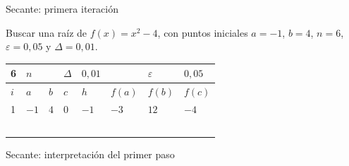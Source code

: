 \documentclass[original_version/main.tex]{subfiles}
\begin{document}
\begin{frame}[t]{Secante: primera iteración}
\begin{minipage}[t][13mm][t]{\textwidth}\small Buscar una raíz de $f(x)=x^2-4$, con puntos iniciales $a=-1$, $b=4$, $n=6$, $\varepsilon=0{,}05$ y $\Delta=0{,}01$.\end{minipage}\par{\scriptsize\setlength{\tabcolsep}{2pt}\renewcommand{\arraystretch}{1}\begin{center}\begin{tabular}{|C{.04\textwidth}|C{.112\textwidth}|C{.112\textwidth}|C{.112\textwidth}|C{.112\textwidth}|C{.112\textwidth}|C{.112\textwidth}|C{.112\textwidth}|}
\hline
\rule{0pt}{4.3mm}6 & $n$ &  &  $\Delta$  & $0{,}01$ &  & $\varepsilon$ & $0{,}05$\\\hline
\rule{0pt}{4.3mm}$i$ & $a$ & $b$ & $c$ & $h$ & $f(a)$ & $f(b)$ & $f(c)$\\\hline
\rule{0pt}{4.3mm}1 & $-1$ & $4$ & $0$ & $-1$ & $-3$ & $12$ & $-4$\\\hline
\rule{0pt}{4.3mm} &  &  &  &  &  &  & \\\hline
\rule{0pt}{4.3mm} &  &  &  &  &  &  & \\\hline
\rule{0pt}{4.3mm} &  &  &  &  &  &  & \\\hline
\rule{0pt}{4.3mm} &  &  &  &  &  &  & \\\hline
\rule{0pt}{4.3mm} &  &  &  &  &  &  & \\\hline
\end{tabular}\end{center}}\begin{minipage}[t][10mm][t]{\textwidth}\footnotesize \end{minipage}
\end{frame}

\begin{frame}{Secante: interpretación del primer paso}
\end{frame}
\end{document}
